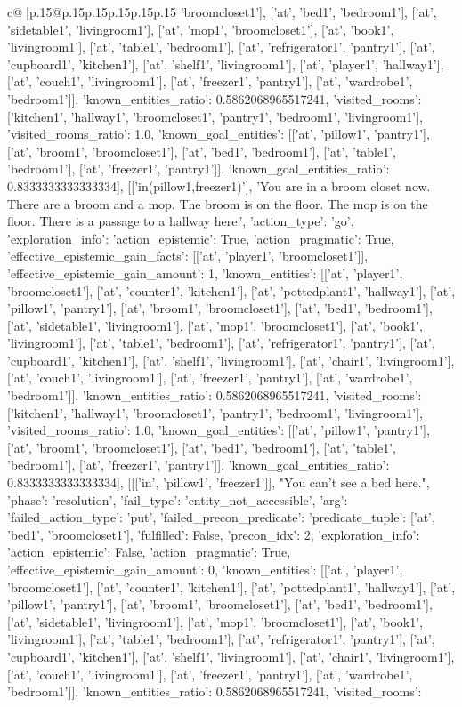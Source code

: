 \documentclass{article}
\begin{document}
{\begin{supertabular}{c@{$\;$}|p{.15\linewidth}@{}p{.15\linewidth}p{.15\linewidth}p{.15\linewidth}p{.15\linewidth}p{.15\linewidth}}
{{{'broomcloset1'], ['at', 'bed1', 'bedroom1'], ['at', 'sidetable1', 'livingroom1'], ['at', 'mop1', 'broomcloset1'], ['at', 'book1', 'livingroom1'], ['at', 'table1', 'bedroom1'], ['at', 'refrigerator1', 'pantry1'], ['at', 'cupboard1', 'kitchen1'], ['at', 'shelf1', 'livingroom1'], ['at', 'player1', 'hallway1'], ['at', 'couch1', 'livingroom1'], ['at', 'freezer1', 'pantry1'], ['at', 'wardrobe1', 'bedroom1']], 'known_entities_ratio': 0.5862068965517241, 'visited_rooms': ['kitchen1', 'hallway1', 'broomcloset1', 'pantry1', 'bedroom1', 'livingroom1'], 'visited_rooms_ratio': 1.0, 'known_goal_entities': [['at', 'pillow1', 'pantry1'], ['at', 'broom1', 'broomcloset1'], ['at', 'bed1', 'bedroom1'], ['at', 'table1', 'bedroom1'], ['at', 'freezer1', 'pantry1']], 'known_goal_entities_ratio': 0.8333333333333334}}], [['in(pillow1,freezer1)'], 'You are in a broom closet now. There are a broom and a mop. The broom is on the floor. The mop is on the floor. There is a passage to a hallway here.', {'action_type': 'go', 'exploration_info': {'action_epistemic': True, 'action_pragmatic': True, 'effective_epistemic_gain_facts': [['at', 'player1', 'broomcloset1']], 'effective_epistemic_gain_amount': 1, 'known_entities': [['at', 'player1', 'broomcloset1'], ['at', 'counter1', 'kitchen1'], ['at', 'pottedplant1', 'hallway1'], ['at', 'pillow1', 'pantry1'], ['at', 'broom1', 'broomcloset1'], ['at', 'bed1', 'bedroom1'], ['at', 'sidetable1', 'livingroom1'], ['at', 'mop1', 'broomcloset1'], ['at', 'book1', 'livingroom1'], ['at', 'table1', 'bedroom1'], ['at', 'refrigerator1', 'pantry1'], ['at', 'cupboard1', 'kitchen1'], ['at', 'shelf1', 'livingroom1'], ['at', 'chair1', 'livingroom1'], ['at', 'couch1', 'livingroom1'], ['at', 'freezer1', 'pantry1'], ['at', 'wardrobe1', 'bedroom1']], 'known_entities_ratio': 0.5862068965517241, 'visited_rooms': ['kitchen1', 'hallway1', 'broomcloset1', 'pantry1', 'bedroom1', 'livingroom1'], 'visited_rooms_ratio': 1.0, 'known_goal_entities': [['at', 'pillow1', 'pantry1'], ['at', 'broom1', 'broomcloset1'], ['at', 'bed1', 'bedroom1'], ['at', 'table1', 'bedroom1'], ['at', 'freezer1', 'pantry1']], 'known_goal_entities_ratio': 0.8333333333333334}}], [[['in', 'pillow1', 'freezer1']], "You can't see a bed here.", {'phase': 'resolution', 'fail_type': 'entity_not_accessible', 'arg': {'failed_action_type': 'put', 'failed_precon_predicate': {'predicate_tuple': ['at', 'bed1', 'broomcloset1'], 'fulfilled': False, 'precon_idx': 2}}, 'exploration_info': {'action_epistemic': False, 'action_pragmatic': True, 'effective_epistemic_gain_amount': 0, 'known_entities': [['at', 'player1', 'broomcloset1'], ['at', 'counter1', 'kitchen1'], ['at', 'pottedplant1', 'hallway1'], ['at', 'pillow1', 'pantry1'], ['at', 'broom1', 'broomcloset1'], ['at', 'bed1', 'bedroom1'], ['at', 'sidetable1', 'livingroom1'], ['at', 'mop1', 'broomcloset1'], ['at', 'book1', 'livingroom1'], ['at', 'table1', 'bedroom1'], ['at', 'refrigerator1', 'pantry1'], ['at', 'cupboard1', 'kitchen1'], ['at', 'shelf1', 'livingroom1'], ['at', 'chair1', 'livingroom1'], ['at', 'couch1', 'livingroom1'], ['at', 'freezer1', 'pantry1'], ['at', 'wardrobe1', 'bedroom1']], 'known_entities_ratio': 0.5862068965517241, 'visited_rooms': }}}
\end{supertabular}}
\end{document}
